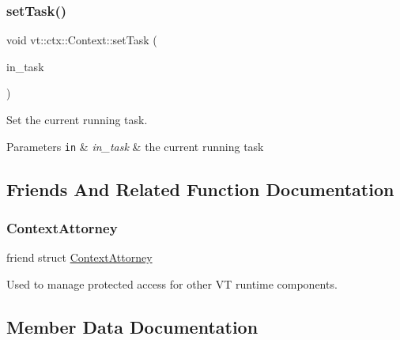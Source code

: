 \subsubsection{\texorpdfstring{set\+Task()}{setTask()}}
{\footnotesize\ttfamily void vt\+::ctx\+::\+Context\+::set\+Task (\begin{DoxyParamCaption}\item[{\hyperlink{structvt_1_1runnable_1_1_runnable_new}{runnable\+::\+Runnable\+New} $\ast$}]{in\+\_\+task }\end{DoxyParamCaption})\hspace{0.3cm}{\ttfamily [protected]}}



Set the current running task. 


\begin{DoxyParams}[1]{Parameters}
\mbox{\tt in}  & {\em in\+\_\+task} & the current running task \\
\hline
\end{DoxyParams}


\subsection{Friends And Related Function Documentation}
\mbox{\label{structvt_1_1ctx_1_1_context_a75c33a90ea59b21ab5375343af0f8e26}} 
\subsubsection{\texorpdfstring{Context\+Attorney}{ContextAttorney}}
{\footnotesize\ttfamily friend struct \hyperlink{structvt_1_1ctx_1_1_context_attorney}{Context\+Attorney}\hspace{0.3cm}{\ttfamily [friend]}}



Used to manage protected access for other VT runtime components. 



\subsection{Member Data Documentation}
\mbox{\label{structvt_1_1ctx_1_1_context_ac9f5afa2cb9a6c06c8570bbf25cde926}} 
